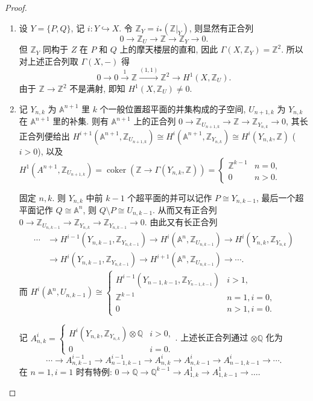 \documentclass{article}
\theoremstyle{exercise}
\theoremstyle{theorem}
\theoremstyle{remark}
\def\A{\mathbb{A}}
\def\Z{\mathbb{Z}}
\def\Q{\mathbb{Q}}
\def\coker{\operatorname{coker}}
\begin{document}
\begin{proof} \hfill
  \begin{enumerate}
    \item 设 $Y = \{ P, Q \}$, 记 $i \colon Y \hookrightarrow X$.
          令 $\Z_Y = i_*(\Z |_Y)$, 则显然有正合列
          \[
          0 \to \Z_U \to \Z \to \Z_Y \to 0.
          \]
          但 $\Z_Y$ 同构于 $Z$ 在 $P$ 和 $Q$ 上的摩天楼层的直和,
          因此 $\Gamma(X, \Z_Y) = \Z^2$. 所以对上述正合列取 $\Gamma(X, -)$ 得
          \[
          0 \to 0 \xrightarrow{1} \Z \xrightarrow{(1, 1)} \Z^2 \to H^1(X, \Z_U).
          \]
          由于  $\Z \to \Z^2$ 不是满射, 即知 $H^1(X, \Z_U) \neq 0$.
    \item 记 $Y_{n, k}$ 为 $\A^{n+1}$ 里 $k$ 个一般位置超平面的并集构成的子空间,
          $U_{n+1, k}$ 为 $Y_{n, k}$ 在 $\A^{n+1}$ 里的补集.
          则有 $\A^{n+1}$ 上的正合列 $0 \to \Z_{U_{n+1, k}} \to \Z \to \Z_{Y_{n, k}} \to 0$,
          其长正合列便给出 $H^{i+1}(\A^{n+1}, \Z_{U_{n+1, k}}) \cong H^i(\A^{n+1}, \Z_{Y_{n, k}}) \cong H^i(Y_{n, k}, \Z)$ ($i > 0$),
          以及 $H^1(A^{n+1}, \Z_{U_{n+1, k}}) = \coker(\Z \to \Gamma(Y_{n, k}, \Z)) = \begin{cases} \Z^{k-1} & n = 0, \\ 0 & n > 0. \end{cases}$

          固定 $n, k$. 则 $Y_{n, k}$ 中前 $k-1$ 个超平面的并可以记作 $P \cong Y_{n, k-1}$,
          最后一个超平面记作 $Q \cong \A^n$, 则 $Q \setminus P \cong U_{n, k-1}$. 从而又有正合列
          $0 \to \Z_{U_{n, k-1}} \to \Z_{Y_{n, k}} \to \Z_{Y_{n, k-1}} \to 0$.
          由此又有长正合列
          \begin{align*}
          \cdots &\to H^{i-1}(Y_{n, k-1}, \Z_{Y_{n, k-1}})
          \to H^i(\A^n, \Z_{U_{n, k-1}})
          \to H^i(Y_{n, k}, \Z_{Y_{n, k}}) \\
          &\to H^i(Y_{n, k-1}, \Z_{Y_{n, k-1}})
          \to H^{i+1}(\A^n, \Z_{U_{n, k-1}})
          \to \cdots.
          \end{align*}
          而 $H^i(\A^n, U_{n, k-1}) \cong \begin{cases} H^{i-1}(Y_{n-1, k-1}, \Z_{Y_{n-1, k-1}}) & i > 1, \\ \Z^{k-1} & n=1, i=0, \\ 0 & n>1, i=0. \end{cases}$

          记 $A_{n, k}^i = \begin{cases} H^i(Y_{n, k}, \Z_{Y_{n, k}}) \otimes \Q & i > 0, \\ 0 & i = 0. \end{cases}$. 上述长正合列通过 $\otimes \Q$ 化为
          \[
          \cdots \to A_{n, k-1}^{i-1} \to A_{n-1, k-1}^{i-1} \to A_{n, k}^i \to A_{n, k-1}^i \to A_{n-1, k-1}^i \to \cdots.
          \]
          在 $n = 1, i = 1$ 时有特例: $0 \to \Q \to \Q^{k-1} \to A_{1, k}^1 \to A_{1, k-1}^1 \to \dots$.


\end{enumerate}
\end{proof}
\end{document}
